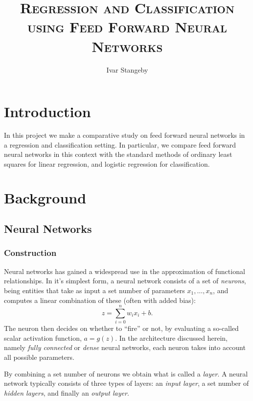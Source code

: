 \documentclass[a4paper, oneside, article]{memoir}
\title{\textsc{Regression and Classification using Feed Forward Neural Networks}}
\author{Ivar Stangeby}
\begin{document}
	\maketitle
	
	\begin{abstract}
		
	\end{abstract}
	\chapter{Introduction}
	

	In this project we make a comparative study on feed forward neural
	networks in a regression and classification setting. In particular, we
	compare feed forward neural networks in this context with the standard
	methods of ordinary least squares for linear regression, and logistic
	regression for classification. 

	\chapter{Background}

	\section{Neural Networks}

	\subsection{Construction}
	Neural networks has gained a widespread use in the approximation of
	functional relationships. In it's simplest form, a neural network
	consists of a set of \emph{neurons}, being entities that take as input
	a set number of parameters \( x_1, \ldots, x_n \), and computes a
	linear combination of these (often with added bias):
	\begin{equation}
		z = \sum_{i = 0}^n w_ix_i + b.
	\end{equation}
	The
	neuron then decides on whether to ``fire'' or not, by evaluating a
	so-called scalar activation function, \( a = g(z) \). In the architecture
	discussed herein, namely \emph{fully connected} or \emph{dense} neural
	networks, each neuron takes into account all possible parameters. 
	
	By combining a set number of neurons we obtain what is called a
	\emph{layer}. A neural network typically consists of three types of
	layers: an \emph{input layer}, a set number of \emph{hidden layers},
	and finally an \emph{output layer}. 
\end{document}
